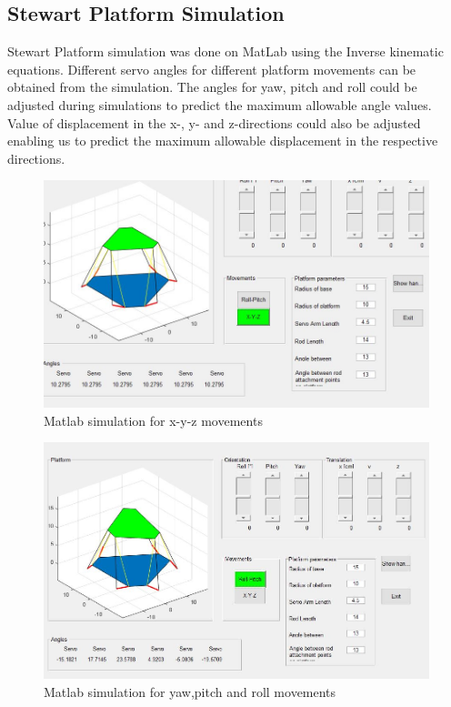 \subsection{Stewart Platform Simulation}
Stewart Platform simulation was done on MatLab using the Inverse kinematic equations. Different servo angles for different platform movements can be obtained from the simulation. The angles for yaw, pitch and roll could be adjusted during simulations to predict the maximum allowable angle values. Value of displacement in the x-, y- and z-directions could also be adjusted enabling us to predict the maximum allowable displacement in the respective directions.
\begin{center}
	\begin{figure}[!h]
	\centering
	\includegraphics[width=0.75\linewidth]{Figures/Matlab}
	\caption[Linear displacements]{Matlab simulation for x-y-z movements}
	\end{figure}
\end{center}
\begin{center}
	\begin{figure}[!htb]
	\centering
	\includegraphics[width=0.75\linewidth]{Figures/Matlab2}
	\caption[Angular displacements]{Matlab simulation for yaw,pitch and roll movements}
	\end{figure}
\end{center}


